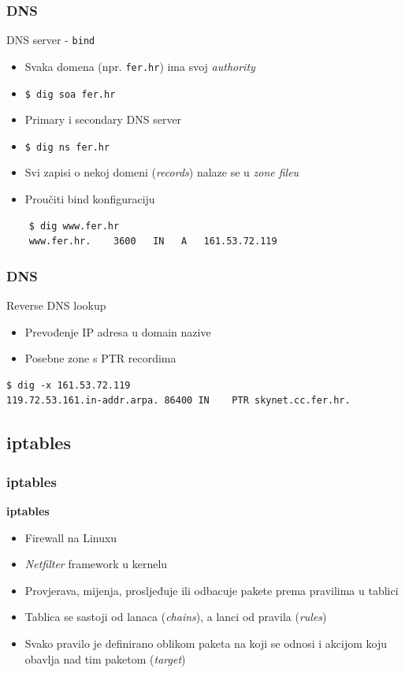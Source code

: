 \documentclass[t,table,usenames,dvipsnames]{beamer}
\begin{document}
\begin{frame}[fragile]
	\frametitle{DNS}
	DNS server - \texttt{bind}
	\begin{itemize}
		\item Svaka domena (npr. \texttt{fer.hr}) ima svoj \textit{authority}
		\item[] \verb|$ dig soa fer.hr|
		\item Primary i secondary DNS server
		\item[] \verb|$ dig ns fer.hr|
	\end{itemize}
	\begin{itemize}
		\item Svi zapisi o nekoj domeni (\textit{records}) nalaze se u \textit{zone fileu}
		\item Proučiti bind konfiguraciju
	\end{itemize}
	\begin{verbatim}
    $ dig www.fer.hr
    www.fer.hr.    3600   IN   A   161.53.72.119
	\end{verbatim}
\end{frame}

\begin{frame}[fragile]
	\frametitle{DNS}
	Reverse DNS lookup
	\begin{itemize}
		\item Prevođenje IP adresa u domain nazive
		\item Posebne zone s PTR recordima
	\end{itemize}
	\begin{verbatim}
$ dig -x 161.53.72.119
119.72.53.161.in-addr.arpa. 86400 IN	PTR	skynet.cc.fer.hr.
	\end{verbatim}
\end{frame}

\subsection{iptables}
\begin{frame}
	\frametitle{iptables}
	\textbf{iptables}
	\begin{itemize}
		\item Firewall na Linuxu
		\item \emph{Netfilter} framework u kernelu
	\end{itemize}
	
	\begin{itemize}
		\item Provjerava, mijenja, prosljeđuje ili odbacuje pakete prema pravilima u tablici
		\item Tablica se sastoji od lanaca (\emph{chains}), a lanci od pravila (\emph{rules})
		\item Svako pravilo je definirano oblikom paketa na koji se odnosi i akcijom koju obavlja nad tim paketom (\emph{target})
	\end{itemize}
\end{frame}
\end{document}
